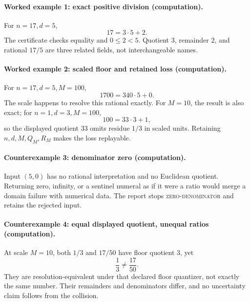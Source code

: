 \paragraph{Worked example 1: exact positive division (computation).}
For \(n=17,d=5\),
\[
                         17=3\cdot5+2.
\]
The certificate checks equality and \(0\leq2<5\).  Quotient \(3\), remainder \(2\), and rational \(17/5\) are three
related fields, not interchangeable names.

\paragraph{Worked example 2: scaled floor and retained loss (computation).}
For \(n=17,d=5,M=100\),
\[
                         1700=340\cdot5+0.
\]
The scale happens to resolve this rational exactly.  For \(M=10\), the result is also exact; for \(n=1,d=3,M=100\),
\[
                         100=33\cdot3+1,
\]
so the displayed quotient \(33\) omits residue \(1/3\) in scaled units.  Retaining \(n,d,M,Q_M,R_M\) makes the loss
replayable.

\paragraph{Counterexample 3: denominator zero (computation).}
Input \((5,0)\) has no rational interpretation and no Euclidean quotient.  Returning zero, infinity, or a sentinel
numeral as if it were a ratio would merge a domain failure with numerical data.  The report stops
\textsc{zero-denominator} and retains the rejected input.

\paragraph{Counterexample 4: equal displayed quotient, unequal ratios (computation).}
At scale \(M=10\), both \(1/3\) and \(17/50\) have floor quotient \(3\), yet
\[
                         \frac13\ne\frac{17}{50}.
\]
They are resolution-equivalent under that declared floor quantizer, not exactly the same number.  Their remainders
and denominators differ, and no uncertainty claim follows from the collision.


